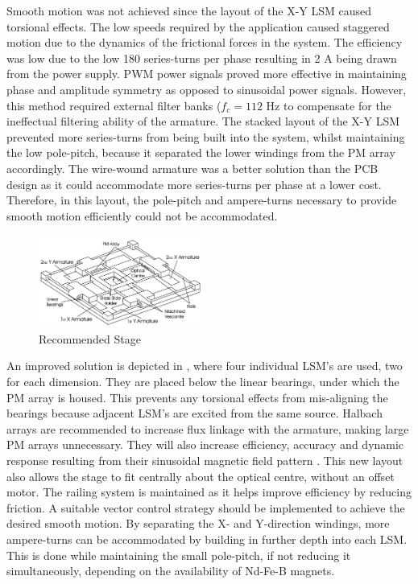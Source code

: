 \documentclass[10pt,twocolumn]{witseiepaper}
\begin{document}
Smooth motion was not achieved since the layout of the X-Y LSM caused
torsional effects.  The low speeds required by the application caused
staggered motion due to the dynamics of the frictional forces in the system.
The efficiency was low due to the low 180 series-turns per phase resulting in
2 A being drawn from the power supply.   PWM power signals proved more
effective in maintaining phase and amplitude symmetry as opposed to sinusoidal
power signals.  However, this method required external filter banks ($f_c=112$
Hz to compensate for the ineffectual filtering ability of the armature.  The
stacked layout of the X-Y LSM prevented more series-turns from being built
into the system, whilst maintaining the low pole-pitch, because it separated
the lower windings from the PM array accordingly.  The wire-wound armature was
a better solution than the PCB design as it could accommodate more
series-turns per phase at a lower cost.  Therefore, in this layout, the
pole-pitch and ampere-turns necessary to provide smooth motion efficiently
could not be accommodated.
\begin{figure}[htb]
	\centering
		\includegraphics[width=0.48\textwidth]{../../Drawings/Future-Stage.pdf}
	\caption{Recommended Stage}
	\label{fig:Recommend}
\end{figure}
\vspace{-8mm} %

An improved solution is depicted in , where four
individual LSM's are used, two for each dimension.  They are placed below
the linear bearings, under which the PM array is housed.  This prevents any
torsional effects from mis-aligning the bearings because adjacent LSM's are
excited from the same source.  Halbach arrays are recommended to increase flux
linkage with the armature, making large PM arrays unnecessary.  They will also
increase efficiency, accuracy and dynamic response resulting from their
sinusoidal magnetic field pattern \cite{Halbach-1,XY-Thrust}.  This new layout
also allows the stage to fit centrally about the optical centre, without an
offset motor.  The railing system is maintained as it helps improve efficiency
by reducing friction.  A suitable vector control strategy should be
implemented to achieve the desired smooth motion.  By separating the X- and
Y-direction windings, more ampere-turns can be accommodated by building in
further depth into each LSM.  This is done while maintaining the small
pole-pitch, if not reducing it simultaneously, depending on the availability
of Nd-Fe-B magnets.
\end{document}
